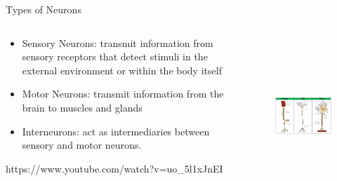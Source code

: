 \documentclass{beamer} %
\begin{document}
\begin{frame}{Types of Neurons}
\begin{columns}
\begin{column}{0.5\textwidth}
\begin{itemize}
    \item Sensory Neurons: transmit information from sensory receptors that detect stimuli in the external environment or within the body itself
    \item Motor Neurons: transmit information from the brain to muscles and glands
    \item Interneurons: act as intermediaries between sensory and motor neurons.
\end{itemize}
https://www.youtube.com/watch?v=uo_5l1xJnEI
\end{column}
\begin{column}{0.45\textwidth}
\begin{figure}
    \includegraphics[width=\textwidth,height = 6cm]{main-qimg-ac1b2a998f1330d9dafc090cbb9658fd.png}
\end{figure}
\end{column}
\end{columns}
\end{frame}
\end{document}
